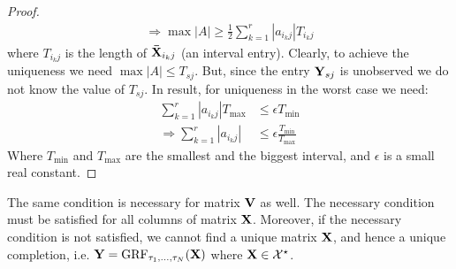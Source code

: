 \documentclass{article}
\newcommand{\sameer}[1]{\todo[color=blue!20]{\textbf{s:} #1}{}}
\begin{document}
\begin{thm:thm}
\begin{proof}
\begin{align}
\Rightarrow \max|A| \geqslant \frac{1}{2}\sum_{k=1}^{r}|a_{i_kj}|T_{i_kj}
\end{align}
where $T_{i_kj}$ is the length of $\bold{\bar X}_{i_kj}$ (an interval entry). Clearly, to achieve the uniqueness we need $\max|A|\leq T_{sj}$. But, since the entry $\mathbf{Y}_{sj}$ is unobserved we do not know the value of $T_{sj}$. In result, for uniqueness in the worst case we need:
\begin{align}
\sum_{k=1}^{r}|a_{i_kj}|T_{\max} &\leq \epsilon T_{\min}\\
\Rightarrow\sum_{k=1}^{r}|a_{i_kj}| &\leq\epsilon \frac{T_{\min}}{T_{\max}}
\end{align} 
Where $T_{\min}$ and $T_{\max}$ are the smallest and the biggest interval, and $\epsilon$ is a small real constant. 
\fi
 \end{proof}
\end{thm:thm}
The same condition is necessary for matrix $\mathbf{V}$ as well. The necessary condition must be satisfied for all columns of matrix $\mathbf{X}$. 
Moreover, if the necessary condition is not satisfied, we cannot find a unique matrix $\mathbf{X}$, and hence a unique completion, i.e. $\mathbf{Y}=\text{GRF}_{\tau_1,...,\tau_N}(\mathbf{X})$ where $\mathbf{X} \in \mathcal{X}^{\star}$.

\end{document}
